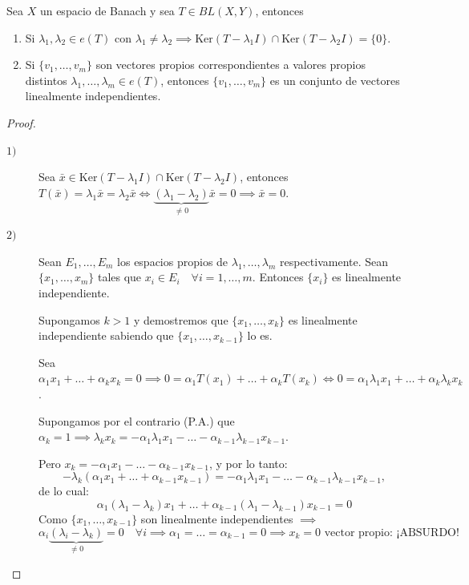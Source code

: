 \begin{teo}
    Sea $X$ un espacio de Banach y sea $T \in BL(X, Y)$, entonces
    \begin{enumerate}
        \item Si $\lambda_1, \lambda_2 \in e(T)$ con $\lambda_1 \neq \lambda_2\implies \text{Ker}(T - \lambda_1 I) \cap \text{Ker}(T - \lambda_2 I) = \{0\}$.
        \item Si $\{v_1, \dots, v_m\}$ son vectores propios correspondientes a valores propios distintos \mbox{$\lambda_1, \dots, \lambda_m \in e(T)$}, entonces $\{v_1, \dots, v_m\}$ es un conjunto de vectores linealmente independientes.
    \end{enumerate}
\begin{proof}
    \begin{description}
        \item[$1)$] Sea $\bar{x} \in \text{Ker}(T - \lambda_1 I) \cap \text{Ker}(T - \lambda_2 I)$, entonces $T(\bar{x}) = \lambda_1 \bar{x} = \lambda_2 \bar{x} \iff \underbrace{(\lambda_1 - \lambda_2)}_{\neq 0} \bar{x} = 0 \implies \bar{x} = 0$.
        \item[$2)$] Sean $E_1, \dots, E_m$ los espacios propios de $\lambda_1, \dots, \lambda_m$ respectivamente. Sean $\{x_1, \dots, x_m\}$ tales que $x_i \in E_i \quad \forall i = 1, \dots, m$. Entonces $\{x_i\}$ es linealmente independiente.

        Supongamos $k > 1$ y demostremos que $\{x_1, \dots, x_k\}$ es linealmente independiente sabiendo que $\{x_1, \dots, x_{k-1}\}$ lo es.

        Sea $\alpha_1 x_1 + \dots + \alpha_k x_k = 0 \implies 0 = \alpha_1 T(x_1) + \dots + \alpha_k T(x_k) \iff 0 = \alpha_1 \lambda_1 x_1 + \dots + \alpha_k \lambda_k x_k$.

        Supongamos por el contrario (P.A.) que $\alpha_k = 1 \implies \lambda_k x_k = -\alpha_1 \lambda_1 x_1 - \dots - \alpha_{k-1} \lambda_{k-1} x_{k-1}$.

        Pero $x_k = -\alpha_1 x_1 - \dots - \alpha_{k-1} x_{k-1}$, y por lo tanto:
        $$ -\lambda_k (\alpha_1 x_1 + \dots + \alpha_{k-1} x_{k-1}) = -\alpha_1 \lambda_1 x_1 - \dots - \alpha_{k-1} \lambda_{k-1} x_{k-1}, $$ de lo cual:
        $$\alpha_1 (\lambda_1 - \lambda_k) x_1 + \dots + \alpha_{k-1} (\lambda_1 - \lambda_{k-1}) x_{k-1} = 0$$
        Como $\{x_1, \dots, x_{k-1}\}$ son linealmente independientes $\implies$
        $$\alpha_i \underbrace{(\lambda_i - \lambda_k)}_{\neq 0} = 0 \quad \forall i \implies \alpha_1 = \dots = \alpha_{k-1} = 0 \implies x_k = 0 \text{ vector propio: ¡ABSURDO!}$$
    \end{description}
\end{proof}
\end{teo}

